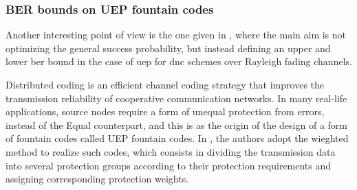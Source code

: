 \subsubsection{BER bounds on UEP fountain codes}
Another interesting point of view is the one given in \cite{Yue2014}, where the main aim is not optimizing the general success probability, but instead defining an upper and lower \gls{ber} bound in the case of \gls{uep} for \gls{dnc} schemes over Rayleigh fading channels.

Distributed coding is an efficient channel coding strategy that improves the transmission reliability of cooperative communication networks. In many real-life applications, source nodes require a form of unequal protection from errors, instead of the Equal counterpart, and this is as the origin of the design of a form of fountain codes called \gls{UEP} fountain codes. In \cite{Yue2014}, the authors adopt the wieghted method to realize such codes, which consists in dividing the transmission data into several protection groups according to their protection requirements and assigning corresponding protection weights.
